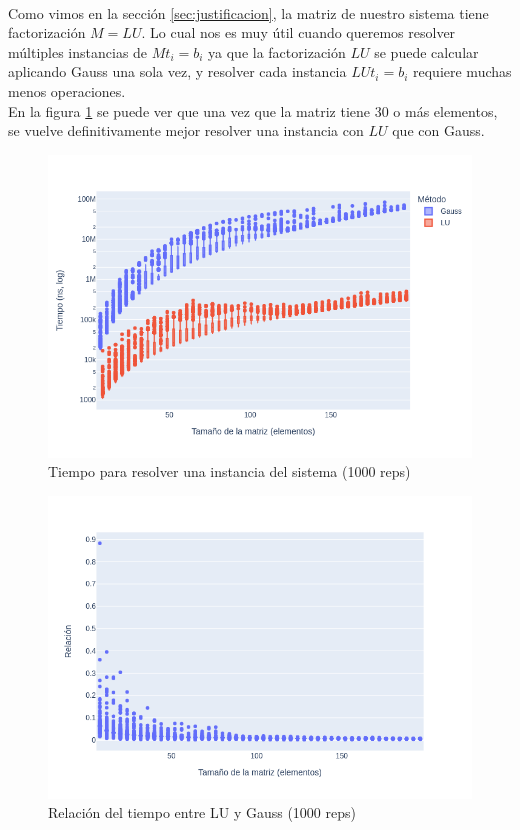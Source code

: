 \documentclass[12pt]{article}
\begin{document}
\paragraph{} Como vimos en la sección \ref{sec:justificacion}, la matriz de nuestro sistema tiene factorización \(M = LU\). Lo cual nos es muy útil cuando queremos resolver múltiples instancias de \(Mt_i = b_i\) ya que la factorización \(LU\) se puede calcular aplicando Gauss una sola vez, y resolver cada instancia \(LUt_i = b_i\) requiere muchas menos operaciones. \\
En la figura \ref{fig:solve.time} se puede ver que una vez que la matriz tiene 30 o más elementos, se vuelve definitivamente mejor resolver una instancia con \(LU\) que con Gauss. 

\begin{figure}[H]
\centering
\includegraphics[width=\textwidth]{times.solve}
\caption{Tiempo para resolver una instancia del sistema (1000 reps)}
\label{fig:solve.time}
\end{figure}

\begin{figure}[H]
\centering
\includegraphics[width=\textwidth]{times.ratio_lu_gauss}
\caption{Relación del tiempo entre LU y Gauss (1000 reps)}
\label{fig:solve.time.ratio}
\end{figure}
\end{document}
